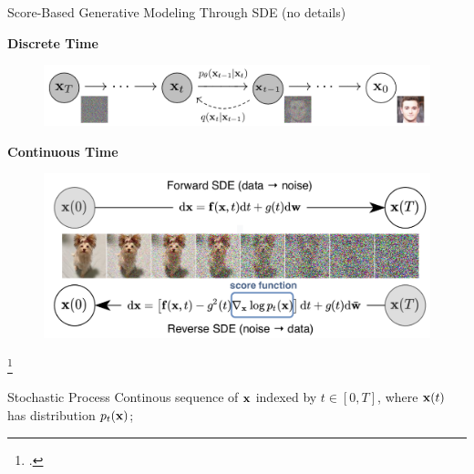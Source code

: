 \documentclass[aspectratio=169, 9pt]{beamer}
\theoremstyle{definition}
\begin{document}
\begin{frame}{Score-Based Generative Modeling Through SDE (no details)}
  \begin{minipage}[h]{0.45\textwidth}
    \begin{center}
      \footnotesize 
      \textbf{Discrete Time}
    \end{center}
    \begin{figure}[h]
      \centering
      \includegraphics[width=\textwidth]{./pic/ho_diffusion.png}
    \end{figure}
  \end{minipage}\hfill%
  \begin{minipage}[h]{0.45\textwidth}
    \begin{center}
      \footnotesize 
      \textbf{\color{rred} Continuous Time}\\
    \end{center}
    \begin{figure}[h]
      \centering
      \includegraphics[width=\textwidth]{./pic/sda_intro.png}
    \end{figure}
  \end{minipage}\footcite{sde}
  \begin{block}{Stochastic Process}
    Continous sequence of $\mathbf{x}$ indexed by $t\in\left[ 0,T \right]$, where $\mathbf{x}(t)$ has distribution $p_t(\mathbf{x})$;
  \end{block}
\end{frame}
\end{document}
